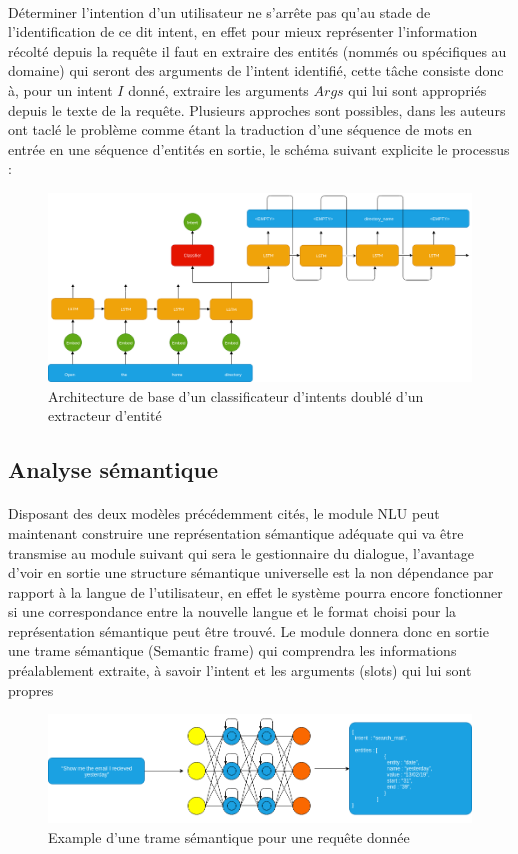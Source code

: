 		\paragraph{}
		Déterminer l'intention d'un utilisateur ne s'arrête pas qu'au stade de l'identification de ce dit intent, en effet pour mieux représenter l'information récolté depuis la requête il faut en extraire des entités (nommés ou spécifiques au domaine) qui seront des arguments de l'intent identifié, cette tâche consiste donc à, pour un intent $I$ donné, extraire les arguments $Args$ qui lui sont appropriés depuis le texte de la requête. Plusieurs approches sont possibles, dans \cite{intent_slots} les auteurs ont taclé le problème comme étant la traduction d'une séquence de mots en entrée en une séquence d'entités en sortie, le schéma suivant explicite le processus :
		\begin{figure}[H]
			\centering
			\label{LSTM_slots}
			\includegraphics[width=0.80\linewidth]{images/NLU/seq2seq.png}
			\caption{Architecture de base d'un classificateur d'intents doublé d'un extracteur d'entité \cite{intent_slots}}
		\end{figure} 
	\subsection{Analyse sémantique}
		\paragraph{}
		Disposant des deux modèles précédemment cités, le module NLU peut maintenant construire une représentation sémantique adéquate qui va être transmise au module suivant qui sera le gestionnaire du dialogue, l'avantage d'voir en sortie une structure sémantique universelle est la non dépendance par rapport à la langue de l'utilisateur, en effet le système pourra encore fonctionner si une correspondance entre la nouvelle langue et le format choisi pour la représentation sémantique peut être trouvé. Le module donnera donc en sortie une trame sémantique (Semantic frame) qui comprendra les informations préalablement extraite, à savoir l'intent et les arguments (slots) qui lui sont propres \cite{intent_classification,intent_slots,semantic_frame} 
		\begin{figure}[H]
			\centering
			\label{semantic_frame}
			\includegraphics[width=0.80\linewidth]{images/NLU/semantic_frames.png}
			\caption{Example d'une trame sémantique pour une requête donnée}
		\end{figure} 
